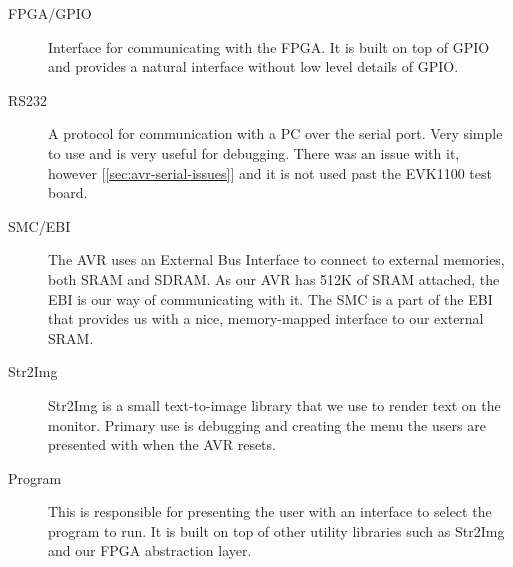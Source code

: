 \begin{description}
\item[FPGA/GPIO] Interface for communicating with the \ac{FPGA}. It is built on
  top of \ac{GPIO} and provides a natural interface without low level details of
  \ac{GPIO}.


\item[RS232] A protocol for communication with a PC over the serial port. Very
  simple to use and is very useful for debugging. There was an issue with it,
  however [\ref{sec:avr-serial-issues}] and it is not used past the EVK1100 test
  board.
  
\item[SMC/EBI] The AVR uses an External Bus Interface to connect to external
  memories, both \ac{SRAM} and \ac{SDRAM}. As our AVR has 512K of \ac{SRAM}
  attached, the \ac{EBI} is our way of communicating with it. The \ac{SMC} is a
  part of the \ac{EBI} that provides us with a nice, memory-mapped interface to
  our external \ac{SRAM}.


\item[Str2Img] Str2Img is a small text-to-image library that we use to render
  text on the monitor. Primary use is debugging and creating the menu the users
  are presented with when the AVR resets.
  
\item[Program] This is responsible for presenting the user with an interface to
  select the program to run. It is built on top of other utility libraries such
  as Str2Img and our \ac{FPGA} abstraction layer.



\end{description}
